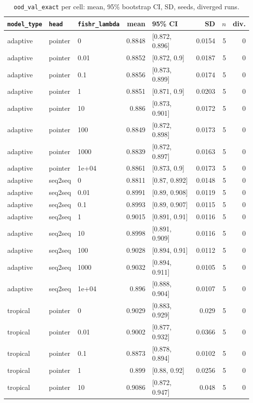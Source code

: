 \documentclass[10pt]{article}
\begin{document}
{\small
\begin{longtable}{lllrlrrr}
\caption{\texttt{ood\_val\_exact} per cell: mean, 95\% bootstrap CI, SD, seeds, diverged runs.}\label{tab:summary-ood_val_exact}\\
\toprule
\texttt{model\_type} & \texttt{head} & \texttt{fishr\_lambda} & mean & 95\% CI & SD & $n$ & div.\\
\midrule
\endhead
adaptive & pointer & 0 & 0.8848 & [0.872, 0.896] & 0.0154 & 5 & 0\\
adaptive & pointer & 0.01 & 0.8852 & [0.872, 0.9] & 0.0187 & 5 & 0\\
adaptive & pointer & 0.1 & 0.8856 & [0.873, 0.899] & 0.0174 & 5 & 0\\
adaptive & pointer & 1 & 0.8851 & [0.871, 0.9] & 0.0203 & 5 & 0\\
adaptive & pointer & 10 & 0.886 & [0.873, 0.901] & 0.0172 & 5 & 0\\
adaptive & pointer & 100 & 0.8849 & [0.872, 0.898] & 0.0173 & 5 & 0\\
adaptive & pointer & 1000 & 0.8839 & [0.872, 0.897] & 0.0163 & 5 & 0\\
adaptive & pointer & 1e+04 & 0.8861 & [0.873, 0.9] & 0.0173 & 5 & 0\\
adaptive & seq2seq & 0 & 0.8811 & [0.87, 0.892] & 0.0148 & 5 & 0\\
adaptive & seq2seq & 0.01 & 0.8991 & [0.89, 0.908] & 0.0119 & 5 & 0\\
adaptive & seq2seq & 0.1 & 0.8993 & [0.89, 0.907] & 0.0115 & 5 & 0\\
adaptive & seq2seq & 1 & 0.9015 & [0.891, 0.91] & 0.0116 & 5 & 0\\
adaptive & seq2seq & 10 & 0.8998 & [0.891, 0.909] & 0.0116 & 5 & 0\\
adaptive & seq2seq & 100 & 0.9028 & [0.894, 0.91] & 0.0112 & 5 & 0\\
adaptive & seq2seq & 1000 & 0.9032 & [0.894, 0.911] & 0.0105 & 5 & 0\\
adaptive & seq2seq & 1e+04 & 0.896 & [0.888, 0.904] & 0.0107 & 5 & 0\\
tropical & pointer & 0 & 0.9029 & [0.883, 0.929] & 0.029 & 5 & 0\\
tropical & pointer & 0.01 & 0.9002 & [0.877, 0.932] & 0.0366 & 5 & 0\\
tropical & pointer & 0.1 & 0.8873 & [0.878, 0.894] & 0.0102 & 5 & 0\\
tropical & pointer & 1 & 0.899 & [0.88, 0.92] & 0.0256 & 5 & 0\\
tropical & pointer & 10 & 0.9086 & [0.872, 0.947] & 0.048 & 5 & 0\\

\end{longtable}}
\end{document}
